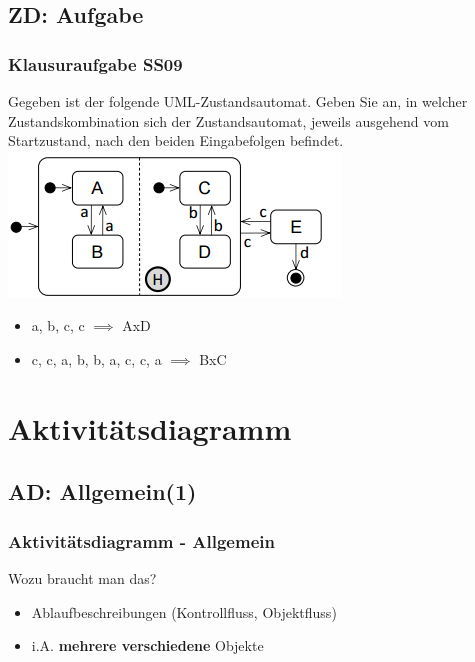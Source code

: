\documentclass[18pt]{beamer}
\begin{document}
	\subsection{ZD: Aufgabe}
	\begin{frame}
		\frametitle{Klausuraufgabe SS09}
		Gegeben ist der folgende UML-Zustandsautomat. Geben Sie an, in welcher Zustandskombination
		sich der Zustandsautomat, jeweils ausgehend vom Startzustand, nach den beiden Eingabefolgen
		befindet.
		\centering
		\includegraphics[scale=0.7]{./pics/tut2/auto_ex.png}
		\begin{itemize}
			\item a, b, c, c \pause $\implies$ AxD
			\item c, c, a, b, b, a, c, c, a \pause $\implies$ BxC
		\end{itemize}
	\end{frame}
		
\section{Aktivitätsdiagramm}
	\subsection{AD: Allgemein(1)}
	\begin{frame}
		\frametitle{Aktivitätsdiagramm - Allgemein}
		\begin{block}{Wozu braucht man das?}
			\pause
			\begin{itemize}
				\item Ablaufbeschreibungen (Kontrollfluss, Objektfluss)
				\item i.A. \textbf{mehrere verschiedene} Objekte
			\end{itemize}
		\end{block}
	\end{frame}
\end{document}
